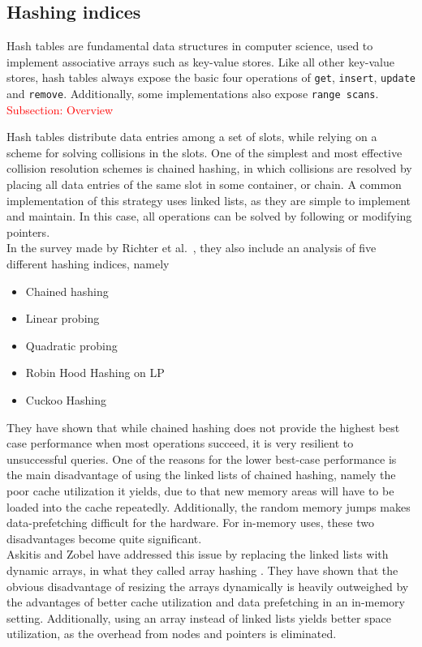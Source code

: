\documentclass[11pt]{article} %
\begin{document}
\subsection{Hashing indices}
Hash tables are fundamental data structures in computer science, used to implement associative arrays such as key-value stores. Like all other key-value stores, hash tables always expose the basic four operations of \verb|get|, \verb|insert|, \verb|update| and \verb|remove|. Additionally, some implementations also expose \verb|range scans|. \\

\textcolor{red}{Subsection: Overview}

Hash tables distribute data entries among a set of slots, while relying on a scheme for solving collisions in the slots. One of the simplest and most effective collision resolution schemes is chained hashing, in which collisions are resolved by placing all data entries of the same slot in some container, or chain. A common implementation of this strategy uses linked lists, as they are simple to implement and maintain. In this case, all operations can be solved by following or modifying pointers. \\

In the survey made by Richter et al.~\cite{RAD15}, they also include an analysis of five different hashing indices, namely
\begin{itemize}
  \item Chained hashing
  \item Linear probing
  \item Quadratic probing
  \item Robin Hood Hashing on LP
  \item Cuckoo Hashing
\end{itemize}
They have shown that while chained hashing does not provide the highest best case performance when most operations succeed, it is very resilient to unsuccessful queries. One of the reasons for the lower best-case performance is the main disadvantage of using the linked lists of chained hashing, namely the poor cache utilization it yields, due to that new memory areas will have to be loaded into the cache repeatedly. Additionally, the random memory jumps makes data-prefetching difficult for the hardware. For in-memory uses, these two disadvantages become quite significant. \\

Askitis and Zobel have addressed this issue by replacing the linked lists with dynamic arrays, in what they called array hashing \cite{NA09, AJ05}. They have shown that the obvious disadvantage of resizing the arrays dynamically is heavily outweighed by the advantages of better cache utilization and data prefetching in an in-memory setting. Additionally, using an array instead of linked lists yields better space utilization, as the overhead from nodes and pointers is eliminated. \\
\end{document}
